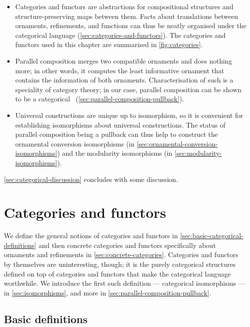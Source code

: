 \begin{itemize}
\item Categories and functors are abstractions for compositional structures and structure-preserving maps between them.
Facts about translations between ornaments, refinements, and functions can thus be neatly organised under the categorical language (\autoref{sec:categories-and-functors}).
The categories and functors used in this chapter are summarised in \autoref{fig:categories}.
\item Parallel composition merges two compatible ornaments and does nothing more; in other words, it computes the least informative ornament that contains the information of both ornaments.
Characterisation of such  is a speciality of category theory; in our case, parallel composition can be shown to be a categorical ~(\autoref{sec:parallel-composition-pullback}).
\item Universal constructions are unique up to isomorphism, so it is convenient for establishing isomorphisms about universal constructions.
The status of parallel composition being a pullback can thus help to construct the ornamental conversion isomorphisms (in \autoref{sec:ornamental-conversion-isomorphisms}) and the modularity isomorphisms (in \autoref{sec:modularity-isomorphisms}).
\end{itemize}
\autoref{sec:categorical-discussion} concludes with some discussion.

\section{Categories and functors}
\label{sec:categories-and-functors}

We define the general notions of categories and functors in \autoref{sec:basic-categorical-definitions} and then concrete categories and functors specifically about ornaments and refinements in \autoref{sec:concrete-categories}.
Categories and functors by themselves are uninteresting, though; it is the purely categorical structures defined on top of categories and functors that make the categorical language worthwhile.
We introduce the first such definition --- categorical isomorphisms --- in \autoref{sec:isomorphisms}, and more in \autoref{sec:parallel-composition-pullback}.

\subsection{Basic definitions}
\label{sec:basic-categorical-definitions}

